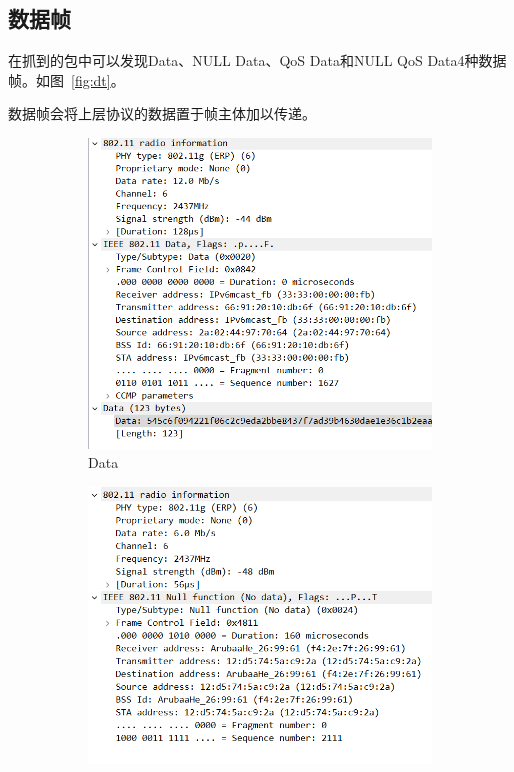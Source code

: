 \documentclass[a4paper,twoside]{article}
\begin{document}
\begin{spacing}{1.2}
\subsection{数据帧}

在抓到的包中可以发现Data、NULL Data、QoS Data和NULL QoS Data4种数据帧。如图~\ref{fig:dt}。

数据帧会将上层协议的数据置于帧主体加以传递。

\begin{figure}[H]
	\centering
	\caption{数据帧}
	\label{fig:dt}
	\begin{subfigure}{0.4\textwidth}
		\centering
		\includegraphics[width=\textwidth]{data.png}
		\caption{Data}
		\label{fig:data}
	\end{subfigure}
	\begin{subfigure}{0.4\textwidth}
		\centering
		\includegraphics[width=\textwidth]{nf.png}

\end{subfigure}
\end{figure}
\end{spacing}
\end{document}
